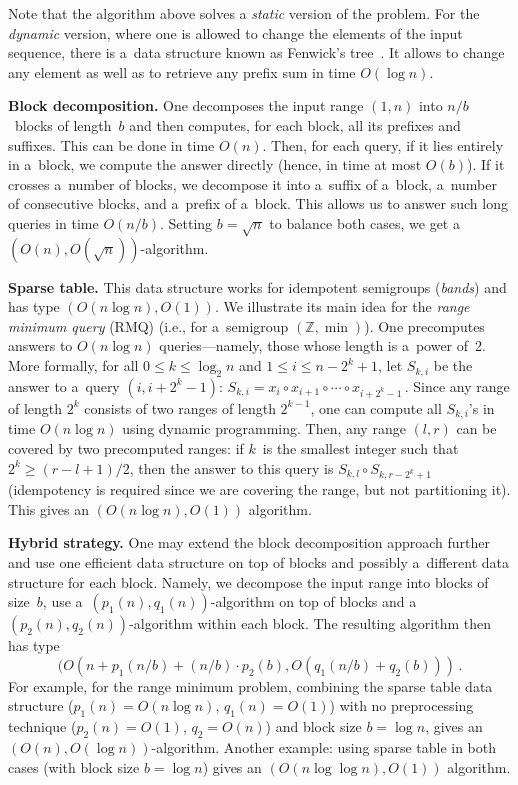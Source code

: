 Note that the algorithm above solves a \emph{static} version of the problem. For
the \emph{dynamic} version, where one is allowed to change the elements of the
input sequence, there is a~data structure known as Fenwick's
tree~\cite{DBLP:journals/spe/Fenwick94}. It allows to change any element as well
as to retrieve any prefix sum in time $O(\log n)$.

\textbf{Block decomposition.} One decomposes the input range $(1,n)$ into
$n/b$~blocks of length~$b$ and then computes, for each block, all its prefixes
and suffixes. This can be done in time $O(n)$. Then, for each query, if it lies
entirely in a~block, we compute the answer directly (hence, in time at most
$O(b)$). If it crosses a~number of blocks, we decompose it into a~suffix of
a~block, a~number of consecutive blocks, and a~prefix of a~block. This allows us
to answer such long queries in time $O(n/b)$. Setting $b=\sqrt{n}$ to balance
both cases, we get a~$(O(n), O(\sqrt{n}))$-algorithm.

\textbf{Sparse table.} This data structure works for idempotent semigroups
(\emph{bands}) and has type $(O(n\log n), O(1))$. We illustrate its main idea
for the \emph{range minimum query} (RMQ)  (i.e., for a~semigroup
$(\mathbb{Z}, \min)$). One precomputes answers to $O(n\log n)$ queries---namely,
those whose length is a~power of~2. More formally, for all $0 \le k \le \log_2n$
and $1 \le i \le n-2^k+1$, let $S_{k,i}$ be the answer to a~query $(i, i+2^k-1)$:
\(S_{k,i}=x_i \circ x_{i+1} \circ \dotsb \circ x_{i+2^k-1} \, .\)
Since any range of length $2^k$ consists of two ranges of length $2^{k-1}$, one
can compute all $S_{k,i}$'s in time $O(n\log n)$ using dynamic programming.
Then, any range $(l,r)$ can be covered by two precomputed ranges: if $k$~is the
smallest integer such that $2^k \ge (r-l+1)/2$, then the answer to this query
is $S_{k,l} \circ S_{k,r-2^k+1}$ (idempotency is required since we are covering
the range, but not partitioning it). This gives an $(O(n\log n), O(1))$
algorithm.

\textbf{Hybrid strategy.} One may extend the block decomposition
approach further and use one efficient data structure on top of
blocks and possibly a~different data structure for each block.
Namely, we decompose the input range into blocks of size~$b$,
use a~$(p_1(n), q_1(n))$-algorithm on top of blocks and
a~$(p_2(n), q_2(n))$-algorithm within each block. The resulting algorithm then
has type
\[(O(n + p_1(n / b) + (n / b) \cdot p_2(b), O(q_1(n/b) + q_2(b))) \, .\]
For example, for the range minimum problem, combining the sparse table data
structure ($p_1(n)=O(n\log n)$, $q_1(n)=O(1)$) with no preprocessing technique
($p_2(n)=O(1)$, $q_2=O(n)$) and block size $b=\log n$, gives
an~$(O(n), O(\log n))$-algorithm. Another example: using sparse table in both
cases (with block size $b=\log n$) gives an $(O(n\log\log n), O(1))$ algorithm.

